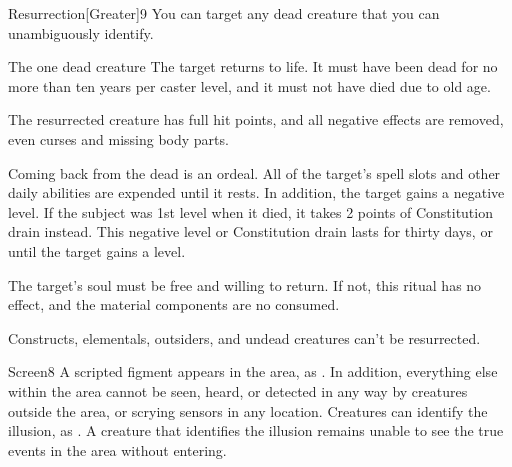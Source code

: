\begin{spellsection}{Resurrection}[Greater]{9}
\spellspecial You can target any dead creature that you can unambiguously identify.
\begin{spelltarget}{The one dead creature}
    \spelleffect The target returns to life. It must have been dead for no more than ten years per caster level, and it must not have died due to old age.

    The resurrected creature has full hit points, and all negative effects are removed, even curses and missing body parts.

    \par Coming back from the dead is an ordeal. All of the target's spell slots and other daily abilities are expended until it rests. In addition, the target gains a negative level. If the subject was 1st level when it died, it takes 2 points of Constitution drain instead. This negative level or Constitution drain lasts for thirty days, or until the target gains a level.
\end{spelltarget}
\spellnotes The target's soul must be free and willing to return. If not, this ritual has no effect, and the material components are no consumed.

Constructs, elementals, outsiders, and undead creatures can't be resurrected.
\end{spellsection}

\begin{spellsection}{Screen}{8}
\spelldur \durext
{}
\spellline
\spelleffect A scripted figment appears in the area, as . In addition, everything else within the area cannot be seen, heard, or detected in any way by creatures outside the area, or scrying sensors in any location.
\spellnotes Creatures can identify the illusion, as . A creature that identifies the illusion remains unable to see the true events in the area without entering.
\end{spellsection}

